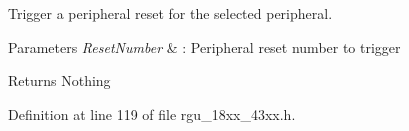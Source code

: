 Trigger a peripheral reset for the selected peripheral. 


\begin{DoxyParams}{Parameters}
{\em Reset\+Number} & \+: Peripheral reset number to trigger \\
\hline
\end{DoxyParams}
\begin{DoxyReturn}{Returns}
Nothing 
\end{DoxyReturn}


Definition at line 119 of file rgu\+\_\+18xx\+\_\+43xx.\+h.

